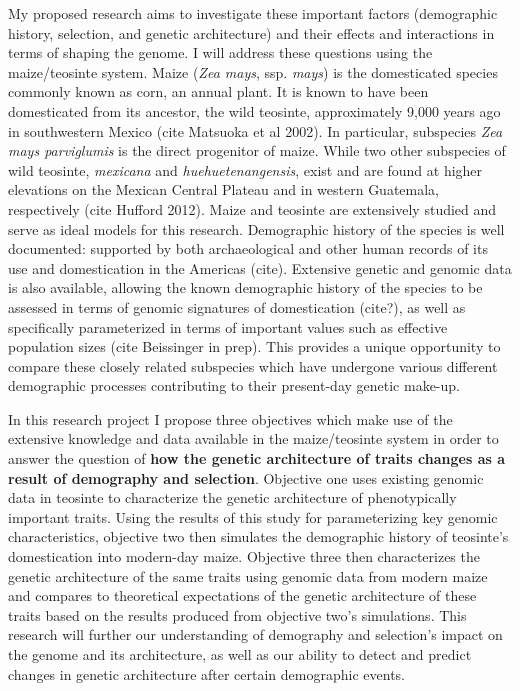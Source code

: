 My proposed research aims to investigate these important factors (demographic history, selection, and genetic architecture) and their effects and interactions in terms of shaping the genome. I will address these questions using the maize/teosinte system. Maize (\emph{Zea mays}, ssp. \emph{mays}) is the domesticated species commonly known as corn, an annual plant. It is known to have been domesticated from its ancestor, the wild teosinte, approximately 9,000 years ago in southwestern Mexico (cite Matsuoka et al 2002). In particular, subspecies \emph{Zea mays parviglumis} is the direct progenitor of maize. While two other subspecies of wild teosinte, \emph{mexicana} and \emph{huehuetenangensis}, exist and are found at higher elevations on the Mexican Central Plateau and in western Guatemala, respectively (cite Hufford 2012). Maize and teosinte are extensively studied and serve as ideal models for this research. Demographic history of the species is well documented: supported by both archaeological and other human records of its use and domestication in the Americas (cite). Extensive genetic and genomic data is also available, allowing the known demographic history of the species to be assessed in terms of genomic signatures of domestication (cite?), as well as specifically parameterized in terms of important values such as effective population sizes (cite Beissinger in prep). This provides a unique opportunity to compare these closely related subspecies which have undergone various different demographic processes contributing to their present-day genetic make-up.

In this research project I propose three objectives which make use of the extensive knowledge and data available in the maize\//teosinte system in order to answer the question of \textbf{how the genetic architecture of traits changes as a result of demography and selection}. Objective one uses existing genomic data in teosinte to characterize the genetic architecture of phenotypically important traits. Using the results of this study for parameterizing key genomic characteristics, objective two then simulates the demographic history of teosinte's domestication into modern-day maize. Objective three then characterizes the genetic architecture of the same traits using genomic data from modern maize and compares to theoretical expectations of the genetic architecture of these traits based on the results produced from objective two's simulations. This research will further our understanding of demography and selection's impact on the genome and its architecture, as well as our ability to detect and predict changes in genetic architecture after certain demographic events.



